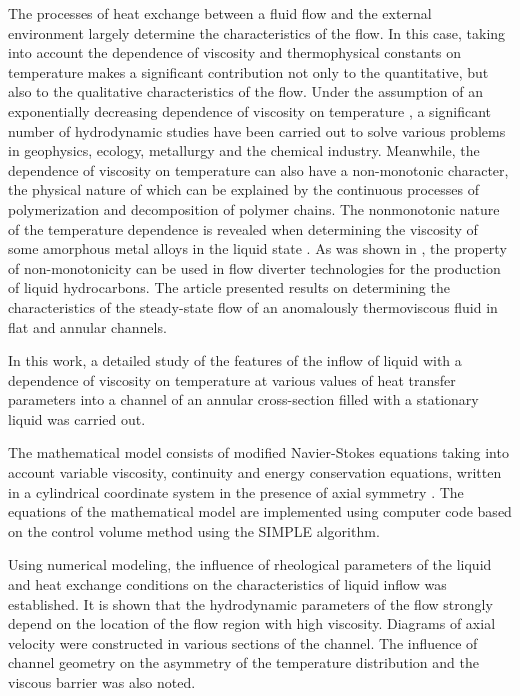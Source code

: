 \documentclass[12pt]{llncs}
\begin{document}
The processes of heat exchange between a fluid flow and the external environment largely determine the characteristics of the flow. In this case, taking into account the dependence of viscosity and thermophysical constants on temperature makes a significant contribution not only to the quantitative, but also to the qualitative characteristics of the flow. Under the assumption of an exponentially decreasing dependence of viscosity on temperature \cite{ref1}, a significant number of hydrodynamic studies have been carried out to solve various problems in geophysics, ecology, metallurgy and the chemical industry. Meanwhile, the dependence of viscosity on temperature can also have a non-monotonic character, the physical nature of which can be explained by the continuous processes of polymerization and decomposition of polymer chains. The nonmonotonic nature of the temperature dependence is revealed when determining the viscosity of some amorphous metal alloys in the liquid state \cite{ref2,ref3}. As was shown in \cite{ref4,ref5}, the property of non-monotonicity can be used in flow diverter technologies for the production of liquid hydrocarbons. The article \cite{ref6,ref7} presented results on determining the characteristics of the steady-state flow of an anomalously thermoviscous fluid in flat and annular channels.

In this work, a detailed study of the features of the inflow of liquid with a dependence of viscosity on temperature at various values of heat transfer parameters into a channel of an annular cross-section filled with a stationary liquid was carried out.

The mathematical model consists of modified Navier-Stokes equations taking into account variable viscosity, continuity and energy conservation equations, written in a cylindrical coordinate system in the presence of axial symmetry \cite{ref8}. The equations of the mathematical model are implemented using computer code based on the control volume method using the SIMPLE algorithm.

Using numerical modeling, the influence of rheological parameters of the liquid and heat exchange conditions on the characteristics of liquid inflow was established. It is shown that the hydrodynamic parameters of the flow strongly depend on the location of the flow region with high viscosity. Diagrams of axial velocity were constructed in various sections of the channel. The influence of channel geometry on the asymmetry of the temperature distribution and the viscous barrier was also noted.
\end{document}

